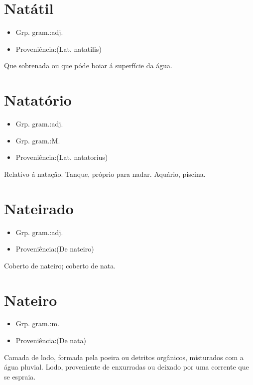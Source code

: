 \section{Natátil}
\begin{itemize}
\item {Grp. gram.:adj.}
\end{itemize}
\begin{itemize}
\item {Proveniência:(Lat. \textunderscore natatilis\textunderscore )}
\end{itemize}
Que sobrenada ou que póde boiar á superfície da água.
\section{Natatório}
\begin{itemize}
\item {Grp. gram.:adj.}
\end{itemize}
\begin{itemize}
\item {Grp. gram.:M.}
\end{itemize}
\begin{itemize}
\item {Proveniência:(Lat. \textunderscore natatorius\textunderscore )}
\end{itemize}
Relativo á natação.
Tanque, próprio para nadar.
Aquário, piscina.
\section{Nateirado}
\begin{itemize}
\item {Grp. gram.:adj.}
\end{itemize}
\begin{itemize}
\item {Proveniência:(De \textunderscore nateiro\textunderscore )}
\end{itemize}
Coberto de nateiro; coberto de nata.
\section{Nateiro}
\begin{itemize}
\item {Grp. gram.:m.}
\end{itemize}
\begin{itemize}
\item {Proveniência:(De \textunderscore nata\textunderscore )}
\end{itemize}
Camada de lodo, formada pela poeira ou detritos orgânicos, misturados com a água pluvial.
Lodo, proveniente de enxurradas ou deixado por uma corrente que se espraia.
